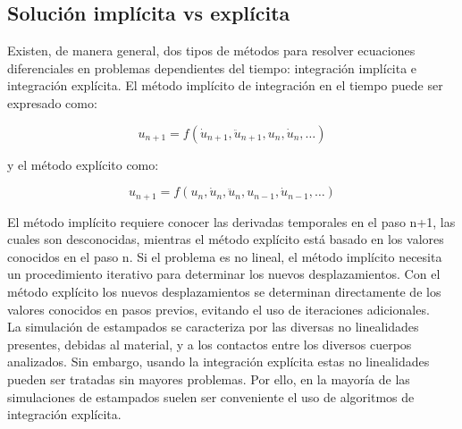 



\subsection{Solución implícita vs explícita}

Existen, de manera general, dos tipos de métodos para resolver ecuaciones diferenciales  
en problemas dependientes del tiempo: integración implícita e integración explícita. El 
método implícito de integración en el tiempo puede ser expresado como: ~\cite{nielsen1997}

\begin{equation}
u_{n+1}=f(\dot{u}_{n+1},\ddot{u}_{n+1},u_n,\dot{u}_n,…)
\end{equation}

y el método explícito como:

\begin{equation}
u_{n+1}=f(u_n,\dot{u}_n,\ddot{u}_n,u_{n-1},\dot{u}_{n-1},…)
\end{equation}

El método implícito requiere conocer las derivadas temporales en el paso n+1, las cuales son desconocidas, mientras el método explícito está basado en los valores conocidos en el paso n. Si el problema es no lineal, el método implícito necesita un procedimiento iterativo para determinar los nuevos desplazamientos. Con el método explícito los nuevos desplazamientos se determinan directamente de los valores conocidos en pasos previos, evitando el uso de iteraciones adicionales.\\

La simulación de estampados se caracteriza por las diversas no linealidades presentes, debidas al material, y a los contactos entre los diversos cuerpos analizados. Sin embargo, usando la integración explícita estas no linealidades pueden ser tratadas sin mayores problemas. Por ello, en la mayoría de las simulaciones de estampados suelen ser conveniente el uso de algoritmos de integración explícita.

